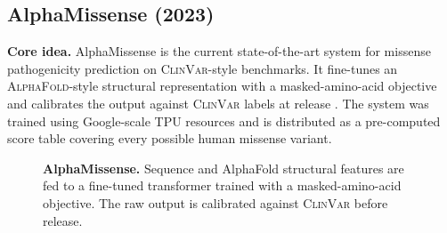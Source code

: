\documentclass[11pt,a4paper,oneside]{report}
\begin{document}
\subsection{AlphaMissense (2023) \texorpdfstring{\citep{cheng2023alphamissense}}{(Cheng et al., 2023)}}
\label{sec:rw-am}

\textbf{Core idea.} AlphaMissense is the current
state-of-the-art system for missense pathogenicity
prediction on \textsc{ClinVar}-style benchmarks. It
fine-tunes an \textsc{AlphaFold}-style structural
representation with a masked-amino-acid objective and
calibrates the output against \textsc{ClinVar} labels
at release \citep{cheng2023alphamissense}. The system
was trained using Google-scale TPU resources and is
distributed as a pre-computed score table covering
every possible human missense variant.

\begin{figure}[htbp]
\centering
{}
\caption[AlphaMissense pipeline]{\textbf{AlphaMissense.}
Sequence and AlphaFold structural features are fed to a
fine-tuned transformer trained with a masked-amino-acid
objective. The raw output is calibrated against
\textsc{ClinVar} before release.}
\label{fig:am-pipeline}
\end{figure}
\end{document}
